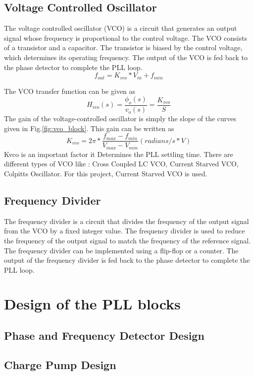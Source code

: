 \subsection{Voltage Controlled Oscillator}
The voltage controlled oscillator (VCO) is a circuit that generates an output signal whose frequency is proportional to the control voltage. The VCO consists of a transistor and a capacitor. The transistor is biased by the control voltage, which determines its operating frequency. The output of the VCO is fed back to the phase detector to complete the PLL loop.
\begin{equation}
	\label{eq:vco_char}
	f_{out} = K_{vco} * V_{in} + f_{min}
\end{equation}

The VCO transfer function can be given as
\begin{equation}
	\label{eq:vco_tf}
	H_{vco}(s) = \frac{\phi_{o}(s)}{v_{o}(s)} = \frac{K_{vco}}{S}
\end{equation}
The gain of the voltage-controlled oscillator is simply the slope of the curves given in Fig.\ref{fig:vco_block}. This gain can be written as
\begin{equation}
	\label{eq:vco_gain}
	K_{vco} = 2\pi  * \frac{f_{max} - f_{min}}{V_{max} - V_{min}}(radians/s * V)
\end{equation}
Kvco is an important factor it Determines the PLL settling time.
There are different types of VCO like : Cross Coupled LC VCO, Current Starved VCO, Colpitts Oscillator. For this project, Current Starved VCO is used.
\subsection{Frequency Divider}
The frequency divider is a circuit that divides the frequency of the output signal from the VCO by a fixed integer value. The frequency divider is used to reduce the frequency of the output signal to match the frequency of the reference signal. The frequency divider can be implemented using a flip-flop or a counter. The output of the frequency divider is fed back to the phase detector to complete the PLL loop.
\section{Design of the PLL blocks}
\subsection{Phase and Frequency Detector Design}
\subsection{Charge Pump Design}
